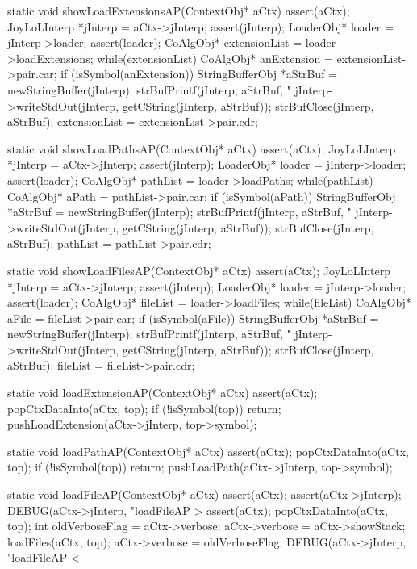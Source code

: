 \startCCode
static void showLoadExtensionsAP(ContextObj* aCtx) {
  assert(aCtx);
  JoyLoLInterp *jInterp = aCtx->jInterp;
  assert(jInterp);
  LoaderObj* loader = jInterp->loader;
  assert(loader);
  CoAlgObj* extensionList = loader->loadExtensions;
  while(extensionList) {
    CoAlgObj* anExtension = extensionList->pair.car;
    if (isSymbol(anExtension)) {
      StringBufferObj *aStrBuf =
        newStringBuffer(jInterp);
      strBufPrintf(jInterp, aStrBuf, "%
      jInterp->writeStdOut(jInterp, getCString(jInterp, aStrBuf));
      strBufClose(jInterp, aStrBuf);
    }
    extensionList = extensionList->pair.cdr;
  }
}
\stopCCode

\startCCode
static void showLoadPathsAP(ContextObj* aCtx) {
  assert(aCtx);
  JoyLoLInterp *jInterp = aCtx->jInterp;
  assert(jInterp);
  LoaderObj* loader = jInterp->loader;
  assert(loader);
  CoAlgObj* pathList = loader->loadPaths;
  while(pathList) {
    CoAlgObj* aPath = pathList->pair.car;
    if (isSymbol(aPath)) {
      StringBufferObj *aStrBuf =
        newStringBuffer(jInterp);
      strBufPrintf(jInterp, aStrBuf, "%
      jInterp->writeStdOut(jInterp, getCString(jInterp, aStrBuf));
      strBufClose(jInterp, aStrBuf);
    }
    pathList = pathList->pair.cdr;
  }
}
\stopCCode

\starttyping
static void showLoadFilesAP(ContextObj* aCtx) {
  assert(aCtx);
  JoyLoLInterp *jInterp = aCtx->jInterp;
  assert(jInterp);
  LoaderObj* loader = jInterp->loader;
  assert(loader);
  CoAlgObj* fileList = loader->loadFiles;
  while(fileList) {
    CoAlgObj* aFile = fileList->pair.car;
    if (isSymbol(aFile)) {
      StringBufferObj *aStrBuf =
        newStringBuffer(jInterp);
      strBufPrintf(jInterp, aStrBuf, "%
      jInterp->writeStdOut(jInterp, getCString(jInterp, aStrBuf));
      strBufClose(jInterp, aStrBuf);
    }
    fileList = fileList->pair.cdr;
  }
}
\stoptyping

\startCCode
static void loadExtensionAP(ContextObj* aCtx) {
  assert(aCtx);
  popCtxDataInto(aCtx, top);
  if (!isSymbol(top)) return;
  pushLoadExtension(aCtx->jInterp, top->symbol);
}
\stopCCode

\startCCode
static void loadPathAP(ContextObj* aCtx) {
  assert(aCtx);
  popCtxDataInto(aCtx, top);
  if (!isSymbol(top)) return;
  pushLoadPath(aCtx->jInterp, top->symbol);
}
\stopCCode

\startCCode
static void loadFileAP(ContextObj* aCtx) {
  assert(aCtx);
  assert(aCtx->jInterp);
  DEBUG(aCtx->jInterp, "loadFileAP > %
  assert(aCtx);
  popCtxDataInto(aCtx, top);
  int oldVerboseFlag = aCtx->verbose;
  aCtx->verbose = aCtx->showStack;
  loadFiles(aCtx, top);
  aCtx->verbose = oldVerboseFlag;
  DEBUG(aCtx->jInterp, "loadFileAP < %
}
\stopCCode

